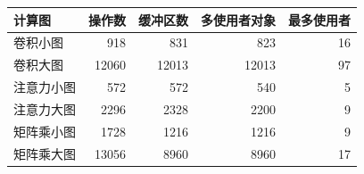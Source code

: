 \begin{tabular}{lrrrr}\toprule
计算图 & 操作数 & 缓冲区数 & 多使用者对象 & 最多使用者\\\midrule
卷积小图 & 918 & 831 & 823 & 16\\
卷积大图 & 12060 & 12013 & 12013 & 97\\
注意力小图 & 572 & 572 & 540 & 5\\
注意力大图 & 2296 & 2328 & 2200 & 9\\
矩阵乘小图 & 1728 & 1216 & 1216 & 9\\
矩阵乘大图 & 13056 & 8960 & 8960 & 17\\
\bottomrule\end{tabular}

